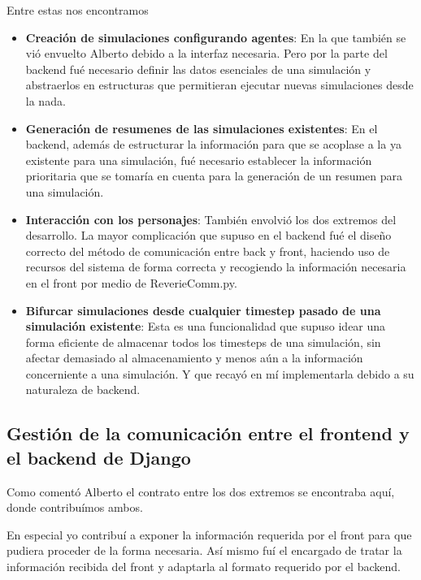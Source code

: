 Entre estas nos encontramos 
\begin{itemize}
    \item \textbf{Creación de simulaciones configurando agentes}: En la que también se vió envuelto Alberto debido a la interfaz necesaria. Pero por la parte del backend fué necesario definir las datos esenciales de una simulación y abstraerlos en estructuras que permitieran ejecutar nuevas simulaciones desde la nada.

    \item \textbf{Generación de resumenes de las simulaciones existentes}: En el backend, además de estructurar la información para que se acoplase a la ya existente para una simulación, fué necesario establecer la información prioritaria que se tomaría en cuenta para la generación de un resumen para una simulación.

    \item \textbf{Interacción con los personajes}: También envolvió los dos extremos del desarrollo. La mayor complicación que supuso en el backend fué el diseño correcto del método de comunicación entre back y front, haciendo uso de recursos del sistema de forma correcta y recogiendo la información necesaria en el front por medio de ReverieComm.py.

    \item \textbf{Bifurcar simulaciones desde cualquier timestep pasado de una simulación existente}: Esta es una funcionalidad que supuso idear una forma eficiente de almacenar todos los timesteps de una simulación, sin afectar demasiado al almacenamiento y menos aún a la información concerniente a una simulación. Y que recayó en mí implementarla debido a su naturaleza de backend.

\end{itemize}

\subsection*{Gestión de la comunicación entre el frontend y el backend de Django}

Como comentó Alberto el contrato entre los dos extremos se encontraba aquí, donde contribuímos ambos.

En especial yo contribuí a exponer la información requerida por el front para que pudiera proceder de la forma necesaria. Así mismo fuí el encargado de tratar la información recibida del front y adaptarla al formato requerido por el backend.